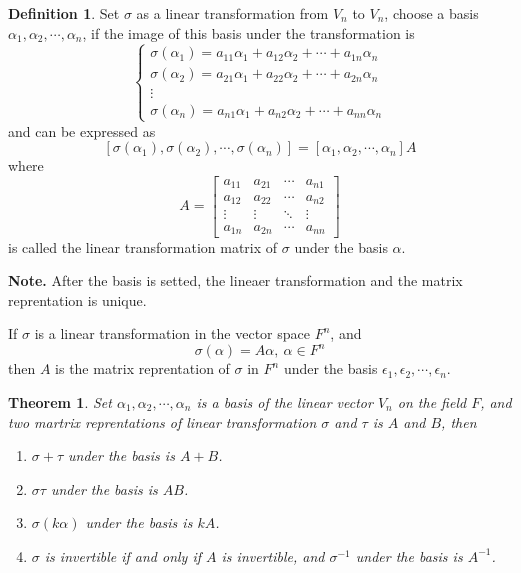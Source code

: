 \documentclass{article}
\newtheorem{theorem}{Theorem}[section]
\theoremstyle{definition}
\newtheorem{defi}{Definition}[section]
\begin{document}
\begin{defi}
    Set $\sigma$ as a linear transformation from $V_{n}$ to $V_{n}$,
    choose a basis $\alpha_{1},\alpha_{2},\cdots,\alpha_{n}$, if the image 
    of this basis under the transformation is 
    $$\begin{cases}
        \sigma(\alpha_{1})=a_{11}\alpha_{1}+a_{12}\alpha_{2}+\cdots+a_{1n}\alpha_{n}\\
        \sigma(\alpha_{2})=a_{21}\alpha_{1}+a_{22}\alpha_{2}+\cdots+a_{2n}\alpha_{n}\\
        \vdots\\
        \sigma(\alpha_{n})=a_{n1}\alpha_{1}+a_{n2}\alpha_{2}+\cdots+a_{nn}\alpha_{n}
    \end{cases}$$
    and can be expressed as 
    $$[\sigma(\alpha_{1}),\sigma(\alpha_{2}),\cdots,\sigma(\alpha_{n})]=[\alpha_{1},\alpha_{2},\cdots,\alpha_{n}]A$$
    where 
    $$A=
    \begin{bmatrix}
        a_{11}&a_{21}&\cdots&a_{n1}\\
        a_{12}&a_{22}&\cdots&a_{n2}\\
        \vdots&\vdots&\ddots&\vdots\\
        a_{1n}&a_{2n}&\cdots&a_{nn}
    \end{bmatrix}$$
    is called the linear transformation matrix of $\sigma$ under
    the basis $\alpha$.
\end{defi}

\textbf{Note.} After the basis is setted, the lineaer transformation and the matrix reprentation is unique.

If $\sigma$ is a linear transformation in the vector space $F^{n}$, and 
$$\sigma(\alpha)=A\alpha,\ \alpha\in F^{n}$$
then $A$ is the matrix reprentation of $\sigma$ in $F^{n}$ 
under the basis $\epsilon_{1},\epsilon_{2},\cdots,\epsilon_{n}$.

\begin{theorem}
    Set $\alpha_{1},\alpha_{2},\cdots,\alpha_{n}$ is a basis of the 
    linear vector $V_{n}$ on the field $F$, and two martrix reprentations of linear transformation 
    $\sigma$ and $\tau$ is $A$ and $B$, then
    \begin{enumerate}
        \item $\sigma+\tau$ under the basis is $A+B$.
        \item $\sigma\tau$ under the basis is $AB$.
        \item $\sigma(k\alpha)$ under the basis is $kA$.
        \item $\sigma$ is invertible if and only if $A$ is invertible, and 
        $\sigma^{-1}$ under the basis is $A^{-1}$.
    \end{enumerate}
\end{theorem}
\end{document}
